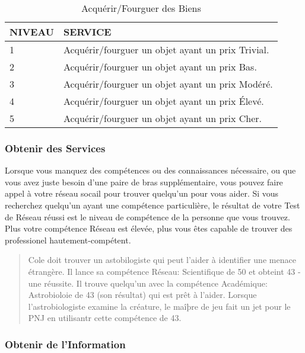 \begin{table} \caption{Acquérir/Fourguer des Biens} \begin{tabular}{|l|l|} \hline

NIVEAU &SERVICE \\ \hline

1 &Acquérir/fourguer un objet ayant un prix Trivial. \\ \hline

2 &Acquérir/fourguer un objet ayant un prix Bas. \\ \hline

3 &Acquérir/fourguer un objet ayant un prix Modéré. \\ \hline

4 &Acquérir/fourguer un objet ayant un prix Élevé. \\ \hline

5 &Acquérir/fourguer un objet ayant un prix Cher. \\ \hline

\end{tabular} \end{table} 



\subsubsection{Obtenir des Services} 

Lorsque vous manquez des compétences ou des connaissances nécessaire, ou que vous avez juste besoin d'une paire de bras supplémentaire, vous pouvez faire appel à votre réseau socail pour trouver quelqu'un pour vous aider. Si vous recherchez quelqu'un ayant une compétence particulière, le résultat de votre Test de Réseau réussi est le niveau de compétence de la personne que vous trouvez. Plus votre compétence Réseau est élevée, plus vous êtes capable de trouver des professionel hautement-compétent. 

\begin{quotation} Cole doit trouver un astobilogiste qui peut l'aider à identifier une menace étrangère. Il lance sa compétence Réseau: Scientifique de 50 et obteint 43 - une réussite. Il trouve quelqu'un avec la compétence Académique: Astrobioloie de 43 (son résultat) qui est prêt à l'aider. Lorsque l'astrobiologiste examine la créature, le maîþre de jeu fait un jet pour le PNJ en utilisantr cette compétence de 43. \end{quotation} 



\subsubsection{Obtenir de l'Information} 

